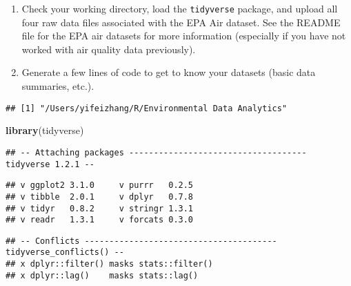 \documentclass[]{article}
\newenvironment{Shaded}{\begin{snugshade}}{\end{snugshade}}
\newcommand{\KeywordTok}[1]{\textcolor[rgb]{0.13,0.29,0.53}{\textbf{#1}}}
\newcommand{\DecValTok}[1]{\textcolor[rgb]{0.00,0.00,0.81}{#1}}
\newcommand{\StringTok}[1]{\textcolor[rgb]{0.31,0.60,0.02}{#1}}
\newcommand{\CommentTok}[1]{\textcolor[rgb]{0.56,0.35,0.01}{\textit{#1}}}
\newcommand{\NormalTok}[1]{#1}
\begin{document}
\begin{enumerate}
\def\labelenumi{\arabic{enumi}.}
\item
  Check your working directory, load the \texttt{tidyverse} package, and
  upload all four raw data files associated with the EPA Air dataset.
  See the README file for the EPA air datasets for more information
  (especially if you have not worked with air quality data previously).
\item
  Generate a few lines of code to get to know your datasets (basic data
  summaries, etc.).
\end{enumerate}

\begin{Shaded}
\end{Shaded}

\begin{verbatim}
## [1] "/Users/yifeizhang/R/Environmental Data Analytics"
\end{verbatim}

\begin{Shaded}
\begin{Highlighting}[]
\KeywordTok{library}\NormalTok{(tidyverse)}
\end{Highlighting}
\end{Shaded}

\begin{verbatim}
## -- Attaching packages ------------------------------------ tidyverse 1.2.1 --
\end{verbatim}

\begin{verbatim}
## v ggplot2 3.1.0     v purrr   0.2.5
## v tibble  2.0.1     v dplyr   0.7.8
## v tidyr   0.8.2     v stringr 1.3.1
## v readr   1.3.1     v forcats 0.3.0
\end{verbatim}

\begin{verbatim}
## -- Conflicts --------------------------------------- tidyverse_conflicts() --
## x dplyr::filter() masks stats::filter()
## x dplyr::lag()    masks stats::lag()
\end{verbatim}

\begin{Shaded}
\end{Shaded}
\end{document}
